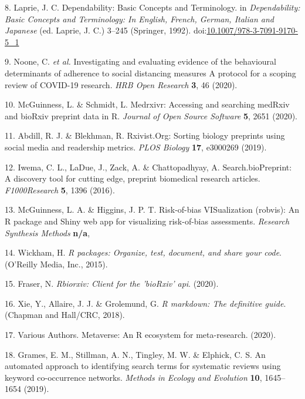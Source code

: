 \documentclass[a4paper, twoside]{templates/ociamthesis}
\begin{document}
\leavevmode\hypertarget{ref-laprie1992}{}%
8. Laprie, J. C. Dependability: Basic Concepts and Terminology. in \emph{Dependability: Basic Concepts and Terminology: In English, French, German, Italian and Japanese} (ed. Laprie, J. C.) 3--245 (Springer, 1992). doi:\href{https://doi.org/10.1007/978-3-7091-9170-5_1}{10.1007/978-3-7091-9170-5\_1}

\leavevmode\hypertarget{ref-noone2020}{}%
9. Noone, C. \emph{et al.} Investigating and evaluating evidence of the behavioural determinants of adherence to social distancing measures A protocol for a scoping review of COVID-19 research. \emph{HRB Open Research} \textbf{3}, 46 (2020).

\leavevmode\hypertarget{ref-mcguinness2020a}{}%
10. McGuinness, L. \& Schmidt, L. Medrxivr: Accessing and searching medRxiv and bioRxiv preprint data in R. \emph{Journal of Open Source Software} \textbf{5}, 2651 (2020).

\leavevmode\hypertarget{ref-abdill2019}{}%
11. Abdill, R. J. \& Blekhman, R. Rxivist.Org: Sorting biology preprints using social media and readership metrics. \emph{PLOS Biology} \textbf{17}, e3000269 (2019).

\leavevmode\hypertarget{ref-iwema2016}{}%
12. Iwema, C. L., LaDue, J., Zack, A. \& Chattopadhyay, A. Search.bioPreprint: A discovery tool for cutting edge, preprint biomedical research articles. \emph{F1000Research} \textbf{5}, 1396 (2016).

\leavevmode\hypertarget{ref-mcguinness}{}%
13. McGuinness, L. A. \& Higgins, J. P. T. Risk-of-bias VISualization (robvis): An R package and Shiny web app for visualizing risk-of-bias assessments. \emph{Research Synthesis Methods} \textbf{n/a},

\leavevmode\hypertarget{ref-wickham2015r}{}%
14. Wickham, H. \emph{R packages: Organize, test, document, and share your code}. (O'Reilly Media, Inc., 2015).

\leavevmode\hypertarget{ref-rbiorxiv}{}%
15. Fraser, N. \emph{Rbiorxiv: Client for the 'bioRxiv' api}. (2020).

\leavevmode\hypertarget{ref-xie2018r}{}%
16. Xie, Y., Allaire, J. J. \& Grolemund, G. \emph{R markdown: The definitive guide}. (Chapman and Hall/CRC, 2018).

\leavevmode\hypertarget{ref-variousauthors2020}{}%
17. Various Authors. Metaverse: An R ecosystem for meta-research. (2020).

\leavevmode\hypertarget{ref-grames2019automated}{}%
18. Grames, E. M., Stillman, A. N., Tingley, M. W. \& Elphick, C. S. An automated approach to identifying search terms for systematic reviews using keyword co-occurrence networks. \emph{Methods in Ecology and Evolution} \textbf{10}, 1645--1654 (2019).
\end{document}
